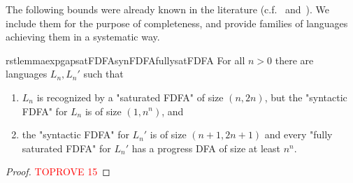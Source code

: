 \documentclass[a4paper,USenglish,cleveref,autoref,thm-restate]{lipics-v2021}
\begin{document}
The following bounds were already known in the literature (c.f.~\cite[Section~5]{Klarlund94} and~\cite[Theorem~2]{AngluinF16}).
We include them for the purpose of completeness, and provide families of languages achieving them in a systematic way.

\begin{restatable}{rstlemma}{expgapsatFDFAsynFDFAfullysatFDFA}
    \label{lemma:expgapsatFDFAsynFDFAfullysatFDFA}
    For all $n > 0$ there are languages $L_n, L_n'$ such that
    \begin{enumerate}
        \item $L_n$ is recognized by a "saturated FDFA" of size $(n, 2n)$, but the "syntactic FDFA" for $L_n$ is of size $(1, n^n)$, and
        \item the "syntactic FDFA" for $L_n'$ is of size $(n+1, 2n + 1)$ and every "fully saturated FDFA" for $L_n'$ has a progress DFA of size at least $n^n$.
    \end{enumerate}
\end{restatable}
\begin{proof}\textcolor{red}{TOPROVE 15}\end{proof}
\end{document}
